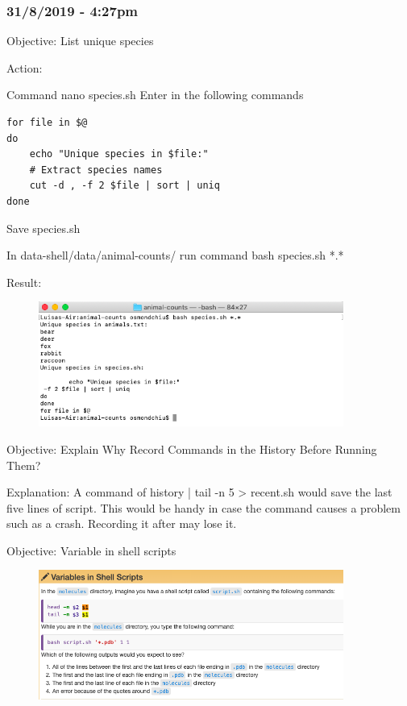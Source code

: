 \documentclass{article}
\begin{document}
\subsubsection*{31/8/2019 - 4:27pm}

Objective: List unique species

Action:

Command nano species.sh
Enter in the following commands

\begin{verbatim}
for file in $@
do
	echo "Unique species in $file:"
	# Extract species names
	cut -d , -f 2 $file | sort | uniq
done \end{verbatim}
Save species.sh

In data-shell/data/animal-counts/ run command bash species.sh *.*

Result:

\begin{figure}[htp]
    \centering
    \includegraphics[width=10cm]{Screenshot20.png}
    \label{fig:ls-20}
\end{figure}

Objective: Explain Why Record Commands in the History Before Running Them?

Explanation: A command of history | tail -n 5 > recent.sh would save the last five lines of script. This would be handy in case the command causes a problem such as a crash. Recording it after may lose it.

Objective: Variable in shell scripts

\begin{figure}[htp]
    \centering
    \includegraphics[width=10cm]{Screenshot21.png}
    \label{fig:ls-21}
\end{figure}
\end{document}
